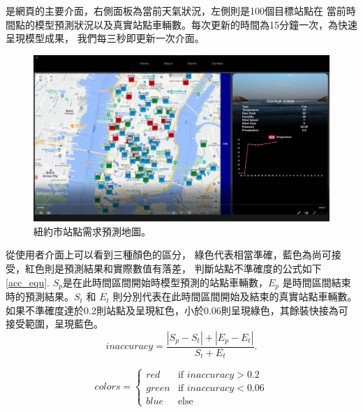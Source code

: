 \documentclass[a4paper,14pt]{extarticle}
\begin{document}
             是網頁的主要介面，右側面板為當前天氣狀況，左側則是100個目標站點在
            當前時間點的模型預測狀況以及真實站點車輛數。每次更新的時間為15分鐘一次，為快速呈現模型成果，
            我們每三秒即更新一次介面。
            \begin{figure}[htbp]
                \centering
                \includegraphics[width=\textwidth]{web-view.png}
                \caption{
                    紐約市站點需求預測地圖。
                }
                \label{fig:web-view}
            \end{figure}
            從使用者介面上可以看到三種顏色的區分，
            綠色代表相當準確，藍色為尚可接受，紅色則是預測結果和實際數值有落差，
            判斷站點不準確度的公式如下 \ref{acc_equ}. $S_p$是在此時間區間開始時模型預測的站點車輛數，$E_p$ 
            是時間區間結束時的預測結果。$S_t$ 和 $E_t$ 則分別代表在此時間區間開始及結束的真實站點車輛數。
            如果不準確度達於0.2則站點及呈現紅色，小於0.06則呈現綠色，其餘裝快接為可接受範圍，呈現藍色。
            \begin{equation}
            \label{acc_equ}
            \text{$inaccuracy$} = \frac{|S_p-S_t|+|E_p-E_t|}{S_t+E_t}.
            \end{equation}

            \[
            colors =
            \begin{cases}
            red & \text{if $inaccuracy>0.2$} \\
            green & \text{if $inaccuracy<0.06$} \\
            blue & \text{else} 
            \end{cases}
            \]
\end{document}
